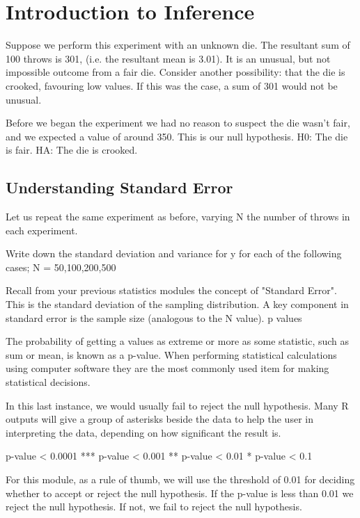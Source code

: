 \section{Introduction to Inference}

Suppose we perform this experiment with an unknown die. The resultant sum of 100 throws is 301, (i.e. the resultant mean is 3.01). 
It is an unusual, but not impossible outcome from a fair die.
Consider another possibility: that the die is crooked, favouring low values. If this was the case, a sum of 301 would not be unusual.

Before we began the experiment we had no reason to suspect the die wasn't fair, and we expected a value of around 350. This is our null hypothesis.
H0: The die is fair.
HA: The die is crooked.
\subsection*{Understanding Standard Error}

Let us repeat the same experiment as before, varying N the number of throws in each experiment.

Write down the standard deviation and variance for y for each of the following cases; N = 50,100,200,500

Recall from your previous statistics modules the concept of "Standard Error". This is the standard deviation of the sampling distribution. A key component in standard error is the sample size (analogous to the N value).
p values

The probability of getting a values as extreme or more as some statistic, such as sum or mean, is known as a p-value. When performing statistical calculations using computer software they are the most commonly used item for making statistical decisions.



In this last instance, we would usually fail to reject the null hypothesis. Many R outputs will give a group of asterisks beside the data to help the user in interpreting the data, depending on how significant the result is.

p-value  < 0.0001  	***
p-value  < 0.001	**
p-value  < 0.01	*
p-value  < 0.1

For this module, as a rule of thumb, we will use the threshold of 0.01 for deciding whether to accept or reject the null hypothesis. If the p-value is less than 0.01 we reject the null hypothesis. If not, we fail to reject the null hypothesis.


